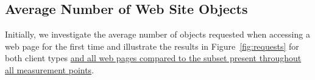 \documentclass[onecolumn,12pt]{IEEEtran}
\begin{document}
\subsection{Average Number of Web Site Objects}
\label{ss:objects}
Initially, we investigate the average number of objects requested when accessing a web page for the first time and illustrate the results in Figure~\ref{fig:requests} for both client types \uline{and all web pages compared to the subset present throughout all measurement points}.
\begin{figure}
\centering
	\\ 
	

\end{figure}
\end{document}
